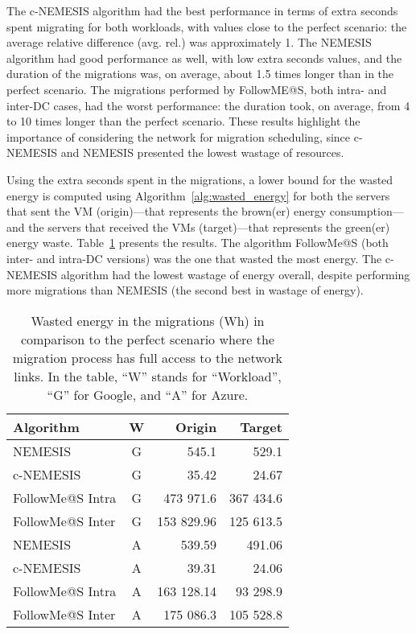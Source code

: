 The c-NEMESIS algorithm had the best performance in terms of extra seconds spent migrating for both workloads, with values close to the perfect scenario: the average relative difference (avg. rel.) was approximately 1. The NEMESIS algorithm had good performance as well, with low extra seconds values, and the duration of the migrations was, on average, about 1.5 times longer than in the perfect scenario. The migrations performed by FollowME@S, both intra- and inter-DC cases, had the worst performance: the duration took, on average, from 4 to 10 times longer than the perfect scenario. These results highlight the importance of considering the network for migration scheduling, since c-NEMESIS and NEMESIS presented the lowest wastage of resources.
                      

Using the extra seconds spent in the migrations, a lower bound for the wasted energy is computed using Algorithm~\ref{alg:wasted_energy} for both the servers that sent the VM (origin)---that represents the brown(er) energy consumption---and the servers that received the VMs (target)---that represents the green(er) energy waste. Table~\ref{tab:wasted_mig} presents the results.  The algorithm FollowMe@S (both inter- and intra-DC versions) was the one that wasted the most energy. The c-NEMESIS algorithm had the lowest wastage of energy overall, despite performing more migrations than NEMESIS (the second best in wastage of energy). 



\begin{table}[h]

\caption{Wasted energy in the migrations (Wh) in comparison to the perfect scenario where the migration process has full access to the network links. In the table, ``W'' stands for ``Workload'', ``G'' for Google, and ``A'' for Azure.}\label{tab:wasted_mig} \centering
\begin{tabular}{|l|c|r|r|}
  \hline
  \textbf{Algorithm} & \textbf{W}  & \textbf{Origin} & \textbf{Target}   \\
  \hline
  NEMESIS  & G & 545.1  & 529.1 \\
  \hline
  c-NEMESIS & G & 35.42  & 24.67 \\
  \hline
  FollowMe@S Intra & G & 473 971.6 & 367 434.6 \\
  \hline
  FollowMe@S Inter & G & 153 829.96  & 125 613.5  \\
  \hline
  NEMESIS  & A & 539.59  & 491.06 \\
  \hline
  c-NEMESIS & A &  39.31 & 24.06   \\
  \hline
  FollowMe@S Intra & A & 163 128.14  & 93 298.9  \\
  \hline
  FollowMe@S Inter & A & 175 086.3  & 105 528.8 \\
  \hline

\end{tabular}
\end{table}



